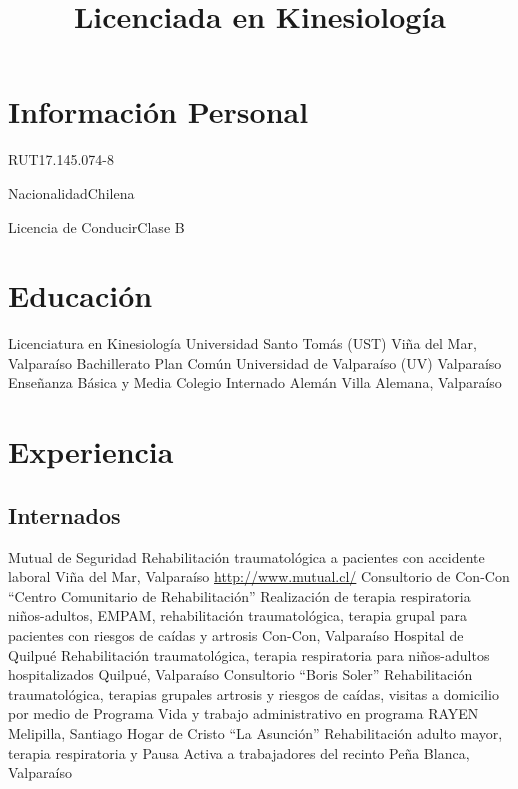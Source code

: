 \documentclass[11pt,a4paper,sans]{moderncv}
\title{Licenciada en Kinesiología}
\begin{document}
\maketitle

\section{Información Personal}

	   {RUT}{17.145.074-8}

	   {Nacionalidad}{Chilena}

	   {Licencia de Conducir}{Clase B}
	   
\section{Educación}

        {Licenciatura en Kinesiología}
        {Universidad Santo Tomás (UST)}
        {Viña del Mar, Valparaíso}
        {}
        {}
        {Bachillerato Plan Común}
        {Universidad de Valparaíso (UV)}
        {Valparaíso}
        {}
        {}
        {Enseñanza Básica y Media}
        {Colegio Internado Alemán}
        {Villa Alemana, Valparaíso}
        {}{}

\section{Experiencia}
\subsection{Internados}
        
        {Mutual de Seguridad}
        {Rehabilitación traumatológica a pacientes con accidente laboral}
        {}
        {Viña del Mar, Valparaíso}
        {\url{http://www.mutual.cl/}}
        {Consultorio de Con-Con ``Centro Comunitario de Rehabilitación''}
        {Realización de terapia respiratoria niños-adultos, EMPAM, rehabilitación traumatológica, terapia grupal para pacientes con riesgos de caídas y artrosis}
        {}
        {}
        {Con-Con, Valparaíso}
        {Hospital de Quilpué}
        {Rehabilitación traumatológica, terapia respiratoria para niños-adultos hospitalizados}
        {}
        {}
        {Quilpué, Valparaíso}
        {Consultorio ``Boris Soler''}
        {Rehabilitación traumatológica, terapias grupales artrosis y riesgos de caídas, visitas a domicilio por medio de Programa Vida y trabajo administrativo en programa RAYEN}
        {}
        {}
        {Melipilla, Santiago}
        {Hogar de Cristo ``La Asunción''}
        {Rehabilitación adulto mayor, terapia respiratoria y Pausa Activa a trabajadores del recinto}
        {}
        {}
        {Peña Blanca, Valparaíso}
        
\end{document}
